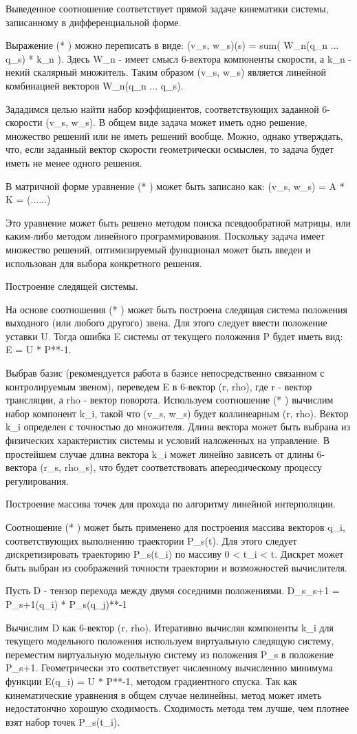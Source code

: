\documentclass{article}
\begin{document}
Выведенное соотношение соответствует прямой задаче кинематики системы, записанному в дифференциальной форме.

Выражение (* ) можно переписать в виде:
(v\_s, w\_s)(s) = sum( W\_n(q\_n ... q\_s) * k\_n ). Здесь W\_n - имеет смысл 6-вектора компоненты скорости, а k\_n - некий скалярный множитель. Таким образом (v\_s, w\_s) является линейной комбинацией векторов W\_n(q\_n ... q\_s).

Зададимся целью найти набор коэффициентов, соответствующих заданной 6-скорости (v\_s, w\_s). В общем виде задача может иметь одно решение, множество решений или не иметь решений вообще. Можно, однако утверждать, что, если заданный вектор скорости геометрически осмыслен, то задача будет иметь не менее одного решения.

В матричной форме уравнение (* ) может быть записано как:
(v\_s, w\_s) = A * K = (......)

Это уравнение может быть решено методом поиска псевдообратной матрицы, или каким-либо методом линейного программирования. Поскольку задача имеет множество решений, оптимизируемый функционал может быть введен и использован для выбора конкретного решения.

Построение следящей системы. 

На основе соотношения (* ) может быть построена следящая система положения выходного (или любого другого) звена. Для этого следует ввести положение уставки U. Тогда ошибка E системы от текущего положения P будет иметь вид:
E = U * P**-1. 

Выбрав базис (рекомендуется работа в базисе непосредственно связанном с контролируемым звеном), переведем E в 6-вектор (r, rho), где r - вектор трансляции, а rho - вектор поворота. Используем соотношение (* ) вычислим набор компонент k\_i, такой что (v\_s, w\_s) будет коллинеарным (r, rho). Вектор k\_i определен с точностью до множителя. Длина вектора может быть выбрана из физических характеристик системы и условий наложенных на управление. В простейшем случае длина вектора k\_i может линейно зависеть от длины 6-вектора (r\_s, rho\_s), что будет соответствовать апереодическому процессу регулирования.   

Построение массива точек для прохода по алгоритму линейной интерполяции. 

Соотношение (* ) может быть применено для построения массива векторов q\_i, соответствующих выполнению траектории P\_s(t). Для этого следует дискретизировать траекторию P\_s(t\_i) по массиву 0 < t\_i < t. Дискрет может быть выбран из соображений точности траектории и возможностей вычислителя.

Пусть D - тензор перехода между двумя соседними положениями.
D\_s\_s+1 = P\_s+1(q\_i) * P\_s(q\_j)**-1

Вычислим D как 6-вектор (r, rho). Итеративно вычисляя компоненты k\_i для текущего модельного положения используем виртуальную следящую систему, переместим виртуальную модельную систему из положения P\_s в положение P\_s+1. Геометрически это соответствует численному вычислению минимума функции E(q\_i) = U * P**-1, методом градиентного спуска. Так как кинематические уравнения в общем случае нелинейны, метод может иметь недостатончно хорошую сходимость. Сходимость метода тем лучше, чем плотнее взят набор точек P\_s(t\_i).  
\end{document}
